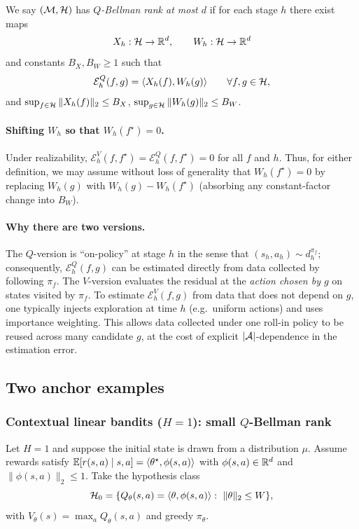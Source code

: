 \begin{definition}
\label{def:q_bellman_rank}
We say $(\mathcal{M},\mathcal{H})$ has \emph{$Q$-Bellman rank at most $d$} if for each stage $h$ there exist maps
\[
X_h:\mathcal{H}\to\mathbb{R}^d,\qquad W_h:\mathcal{H}\to\mathbb{R}^d
\]
and constants $B_X,B_W\ge 1$ such that
\[
\mathcal{E}_h^{Q}(f,g)=\langle X_h(f), W_h(g)\rangle\qquad \forall f,g\in\mathcal{H},
\]
and $\sup_{f\in\mathcal{H}}\|X_h(f)\|_2\le B_X$, $\sup_{g\in\mathcal{H}}\|W_h(g)\|_2\le B_W$.
\end{definition}

\paragraph{Shifting $W_h$ so that $W_h(f^\star)=0$.}
Under realizability, $\mathcal{E}_h^{V}(f,f^\star)=\mathcal{E}_h^{Q}(f,f^\star)=0$ for all $f$ and $h$.
Thus, for either definition, we may assume without loss of generality that $W_h(f^\star)=0$ by replacing
$W_h(g)$ with $W_h(g)-W_h(f^\star)$ (absorbing any constant-factor change into $B_W$).

\paragraph{Why there are two versions.}
The $Q$-version is ``on-policy'' at stage $h$ in the sense that $(s_h,a_h)\sim d_h^{\pi_f}$; consequently,
$\mathcal{E}_h^{Q}(f,g)$ can be estimated directly from data collected by following $\pi_f$.
The $V$-version evaluates the residual at the \emph{action chosen by $g$} on states visited by $\pi_f$.
To estimate $\mathcal{E}_h^{V}(f,g)$ from data that does not depend on $g$, one typically injects
exploration at time $h$ (e.g.\ uniform actions) and uses importance weighting.  This allows data collected
under one roll-in policy to be reused across many candidate $g$, at the cost of explicit $|\mathcal{A}|$-dependence
in the estimation error.

\subsection{Two anchor examples}
\label{sec:br_two_examples}

\subsubsection{Contextual linear bandits ($H=1$): small $Q$-Bellman rank}

Let $H=1$ and suppose the initial state is drawn from a distribution $\mu$.
Assume rewards satisfy $\mathbb{E}[r(s,a)\mid s,a]=\langle \theta^\star,\phi(s,a)\rangle$ with
$\phi(s,a)\in\mathbb{R}^d$ and $\|\phi(s,a)\|_2\le 1$.  Take the hypothesis class
\[
\mathcal{H}_0=\{Q_\theta(s,a)=\langle \theta,\phi(s,a)\rangle:\ \|\theta\|_2\le W\},
\]
with $V_\theta(s)=\max_a Q_\theta(s,a)$ and greedy $\pi_\theta$.

